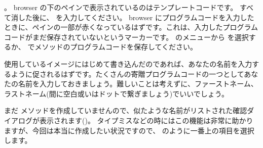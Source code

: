 \documentclass[a4paper,10pt,twoside]{book}
\begin{document}
。
browser の下のペインで表示されているのはテンプレートコードです。
すべて消した後に、 を入力してください。
browser にプログラムコードを入力したときに、ペインの一部が赤くなっているはずです。これは、入力したプログラムコードがまだ保存されていないというマーカーです。
\actclick のメニューから  を選択するか、 でメソッドのプログラムコードを保存してください。

使用しているイメージにはじめて書き込んだのであれば、あなたの名前を入力するように促されるはずです。たくさんの寄贈プログラムコードの一つとしてあなたの名前を入力しておきましょう。難しいことは考えずに、ファーストネーム、ラストネーム(間に空白或いはドットで繋ぎましょう)でいいでしょう。


まだ  メソッドを作成していませんので、似たような名前がリストされた確認ダイアログが表示されます()。
タイプミスなどの時にはこの機能は非常に助かりますが、今回は本当に作成したい状況ですので、 のように一番上の項目を選択します。


\end{document}
